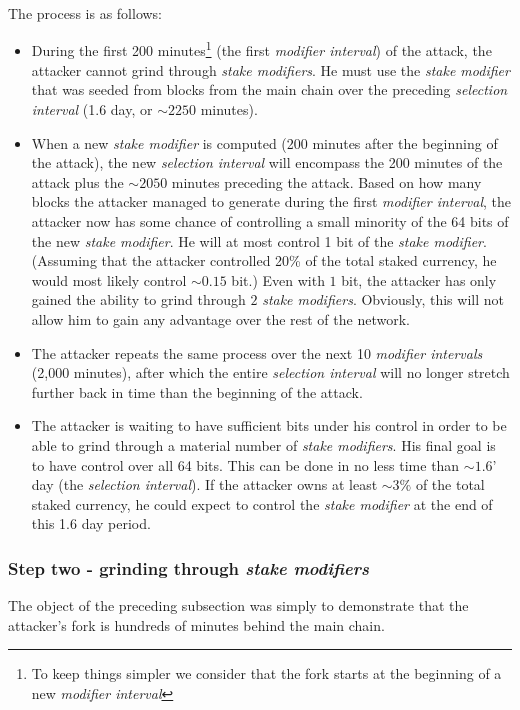 \documentclass[a4paper,11pt]{article}
\begin{document}
The process is as follows:
\begin{itemize}
\setlength{\itemsep}{0pt}
\item{During the first 200 minutes\footnote{To keep things simpler we consider that the fork starts at the beginning of a new \textit{modifier interval}} (the first \textit{modifier interval}) of the attack, the attacker cannot grind through \textit{stake modifiers}.   He must use the \textit{stake modifier} that was seeded from blocks from the main chain over the preceding \textit{selection interval} (1.6 day, or $\sim2250$ minutes).}
\item{When a new \textit{stake modifier} is computed (200 minutes after the beginning of the attack), the new \textit{selection interval} will encompass the 200 minutes of the attack plus the $\sim2050$ minutes preceding the attack. Based on how many blocks the attacker managed to generate during the first \textit{modifier interval}, the attacker now has some chance of controlling a small minority of the 64 bits of the new \textit{stake modifier}. He will at most control 1 bit of the \textit{stake modifier}. (Assuming that the attacker controlled 20\% of the total staked currency, he would most likely control $\sim0.15$ bit.) Even with $1$ bit, the attacker has only gained the ability to grind through $2$ \textit{stake modifiers}. Obviously, this will not allow him to gain any advantage over the rest of the network.}
\item{The attacker repeats the same process over the next 10 \textit{modifier intervals} (2,000 minutes), after which the entire \textit{selection interval} will no longer stretch further back in time than the beginning of the attack.}
\item{The attacker is waiting to have sufficient bits under his control in order to be able to grind through a material number of \textit{stake modifiers}. His final goal is to have control over all 64 bits. This can be done in no less time than $\sim1.6$' day (the \textit{selection interval}). If the attacker owns at least $\sim3\%$ of the total staked currency, he could expect to control the \textit{stake modifier} at the end of this 1.6 day period.}
\end{itemize}

\subsubsection*{Step two - grinding through \textit{stake modifiers}}

The object of the preceding subsection was simply to demonstrate that the attacker's fork is hundreds of minutes behind the main chain. 
\end{document}
